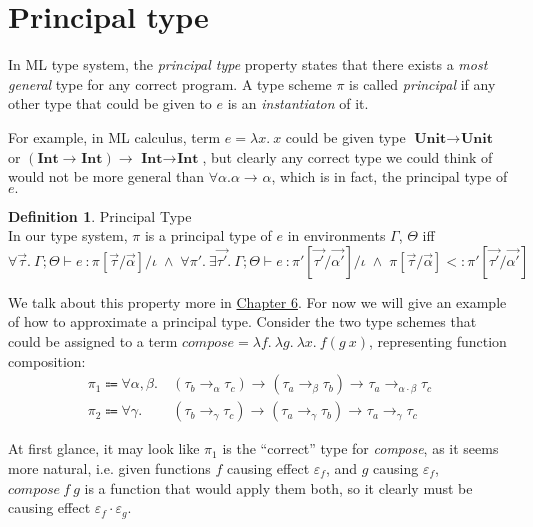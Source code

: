 \documentclass[declaration,shortabstract]{iithesis}
\theoremstyle{definition} \newtheorem{definition}{Definition}[section]
\newcommand{\types}[4][\Gamma;\Theta]{\ensuremath{{{#1} \vdash {#2} \: : {#3}/{#4}}}}
\newcommand{\arrow}[3]{{#1}\rightarrow_{#2}{#3}}
\newcommand{\lam}[1][x]{\ensuremath{\lambda #1.\:}}
\begin{document}
\section{Principal type}
In ML type system, the \textit{principal type} property states that there exists
a \textit{most general} type for any correct program\cite{principal}. 
A type scheme $\pi$ is called \textit{principal} if any other type that
could be given to $e$ is an \textit{instantiaton} of it.

For example, in ML calculus, term $e = \lam x$ could be given type
$\arrow{\textbf{Unit}}{}{\textbf{Unit}}$ or $\arrow{(\arrow{\textbf{Int}}{}{\textbf{Int}})}{}{\arrow{\textbf{Int}}{}{\textbf{Int}}}$,
but clearly any correct type we could think of would not be more general than $\forall \alpha . \arrow{\alpha}{}{\alpha}$, which is in fact, the principal type of $e.$

\theoremstyle{definition}
\begin{definition}{Principal Type}
\\
In our type system, $\pi$ is a principal type of $e$ in environments $\Gamma$, $\Theta$ iff
$$ \forall \vec{\tau}. \: \types{e}{\pi[\vec{\tau} / \vec{\alpha}]}{\iota} \;\wedge\;
    \forall \pi'.\:\exists \vec{\tau'}.\: \types{e}{\pi'[\vec{\tau'} / \vec{\alpha'}]}{\iota} \;\wedge\; 
    \pi[\vec{\tau} / \vec{\alpha}] <: \pi'[\vec{\tau'} / \vec{\alpha'}]
$$
\end{definition}

We talk about this property more in \hyperlink{chapter.6}{Chapter 6}.
For now we will give an example of how to approximate a principal type.
Consider the two type schemes that could be assigned to a term $\textit{compose} = \lam[f]\lam[g]\lam f (g\:x) $, representing function composition:
\begin{align*}
    \pi_1\Coloneqq  \forall\alpha,\beta. &\:
    \arrow{(\arrow{\tau_b}{\alpha}{\tau_c})}{}{
        \arrow{(\arrow{\tau_a}{\beta}{\tau_b})}{}{
                \arrow{\tau_a}{\alpha \cdot \beta}{\tau_c}}} 
    \\
    \pi_2\Coloneqq  \forall\gamma      . &\:
    \arrow{(\arrow{\tau_b}{\gamma}{\tau_c})}{}{
        \arrow{(\arrow{\tau_a}{\gamma}{\tau_b})}{}{
                \arrow{\tau_a}{\gamma}{\tau_c}}} 
\end{align*}

At first glance, it may look like $\pi_1$ is the ``correct'' type for \textit{compose}, as it seems more natural,
 i.e. given functions $f$ causing effect $\varepsilon_f$, and $g$ causing $\varepsilon_f$, $\textit{compose}\:f\:g$
is a function that would apply them both, so it clearly must be causing effect $\varepsilon_f \cdot \varepsilon_g$.
\end{document}
